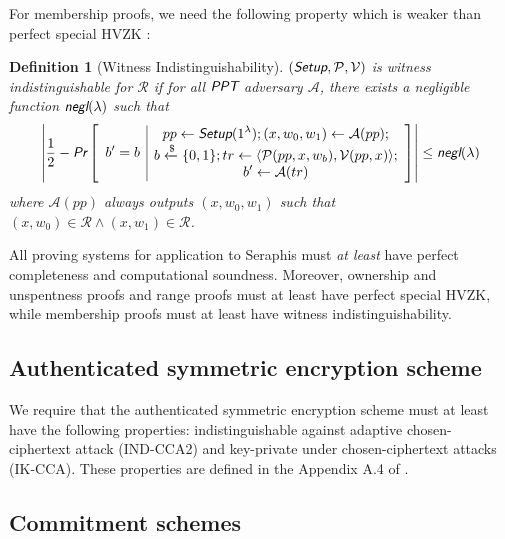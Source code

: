 \documentclass{article}
\newtheorem{definition}{Definition}[section]
\begin{document}
For membership proofs, we need the following property which is weaker than perfect special HVZK \cite{groth}:
\begin{definition}[Witness Indistinguishability]
$(\emph{\textsf{Setup}}, \mathcal{P}, \mathcal{V})$ is witness indistinguishable for $\mathcal{R}$ if for all $\emph{\textsf{PPT}}$ adversary $\mathcal{A}$, there exists a negligible function $\emph{\textsf{negl}}(\lambda)$ such that
\begin{align*}
\left| \frac{1}{2} - \emph{\textsf{Pr}}\left[
\begin{array}{c|c}
    \begin{gathered}
        b' = b
    \end{gathered}
    &
    \begin{gathered}
        pp\leftarrow\emph{\textsf{Setup}}(1^{\lambda}); (x, w_0, w_1)\leftarrow\mathcal{A}(pp); \\
        b\xleftarrow{\$}\{0,1\}; tr\leftarrow\langle\mathcal{P}(pp,x,w_b), \mathcal{V}(pp,x)\rangle; \\
        b'\leftarrow\mathcal{A}(tr)
    \end{gathered}
\end{array}
\right]\right|
\le\emph{\textsf{negl}}(\lambda)
\end{align*}
where $\mathcal{A}(pp)$ always outputs $(x,w_0,w_1)$ such that $(x,w_0)\in\mathcal{R}\wedge(x,w_1)\in\mathcal{R}$.
\end{definition}

All proving systems for application to Seraphis must \textit{at least} have perfect completeness and computational soundness. Moreover, ownership and unspentness proofs and range proofs must at least have perfect special HVZK, while membership proofs must at least have witness indistinguishability.

\subsection{Authenticated symmetric encryption scheme}\label{sec-symm}
We require that the authenticated symmetric encryption scheme must at least have the following properties: indistinguishable against adaptive chosen-ciphertext attack (IND-CCA2) and key-private under chosen-ciphertext attacks (IK-CCA). These properties are defined in the Appendix A.4 of \cite{omniring}.

\subsection{Commitment schemes}\label{Comm}
\end{document}
